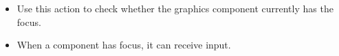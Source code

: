 \begin{itemize}
\item Use this action to check whether the graphics component currently has the focus. 
\item When a component has focus, it can receive input. 
\end{itemize}
